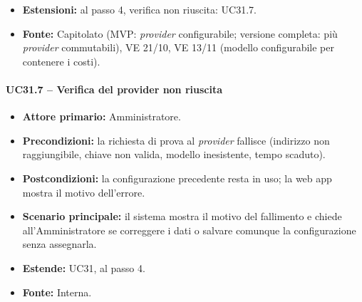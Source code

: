\documentclass[12pt,a4paper]{article}
\newcommand{\tightlist}{\setlength{\itemsep}{1pt}\setlength{\parskip}{0pt}}
\begin{document}
\begin{itemize}
\begin{itemize}
\item \textbf{UC31.3 -- Chiave API:} inserita una volta, poi mostrata solo mascherata.

\item \textbf{UC31.4 -- Scelta del modello:} dall'elenco esposto dal \emph{provider} o inserito a mano.

\item \textbf{UC31.5 -- Assegnazione:} \emph{provider} predefinito della casa e, se serve, \emph{provider} specifico per un dispositivo.

\item \textbf{UC31.6 -- Verifica della connessione:} il sistema prova una richiesta minima e mostra l'esito.

\item \textbf{UC31.8 -- Più provider configurati:} più \emph{provider} configurati insieme, commutabili senza riavviare il server.

\end{itemize}

\item \textbf{Estensioni:} al passo 4, verifica non riuscita: UC31.7.

\item \textbf{Fonte:} Capitolato (MVP: \emph{provider} configurabile; versione completa: più \emph{provider} commutabili), VE 21/10, VE 13/11 (modello configurabile per contenere i costi).

\end{itemize}



\paragraph{UC31.7 -- Verifica del provider non riuscita}

\begin{itemize}

\tightlist

\item \textbf{Attore primario:} Amministratore.

\item \textbf{Precondizioni:} la richiesta di prova al \emph{provider} fallisce (indirizzo non raggiungibile, chiave non valida, modello inesistente, tempo scaduto).

\item \textbf{Postcondizioni:} la configurazione precedente resta in uso; la web app mostra il motivo dell'errore.

\item \textbf{Scenario principale:} il sistema mostra il motivo del fallimento e chiede all'Amministratore se correggere i dati o salvare comunque la configurazione senza assegnarla.

\item \textbf{Estende:} UC31, al passo 4.

\item \textbf{Fonte:} Interna.

\end{itemize}
\end{document}
